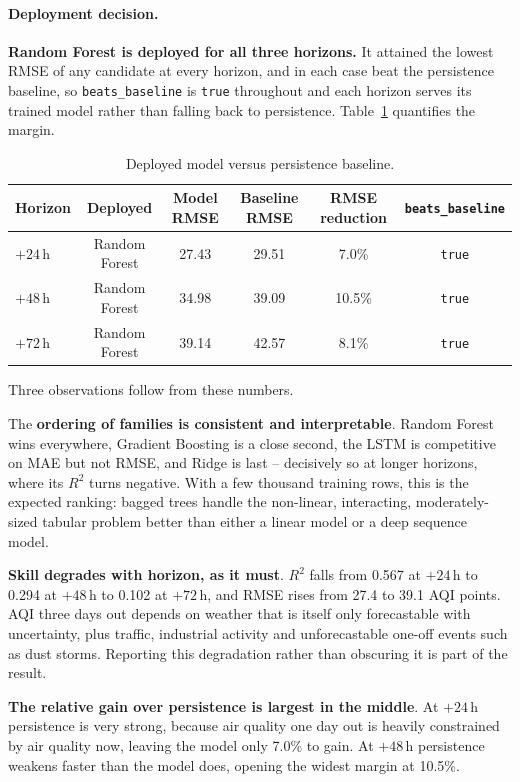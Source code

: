 \documentclass[11pt,a4paper]{article}
\begin{document}
\paragraph{Deployment decision.}
\textbf{Random Forest is deployed for all three horizons.} It attained the
lowest RMSE of any candidate at every horizon, and in each case beat the
persistence baseline, so \texttt{beats\_baseline} is \texttt{true} throughout
and each horizon serves its trained model rather than falling back to
persistence. Table~\ref{tab:baseline} quantifies the margin.

\begin{table}[H]
\centering
\caption{Deployed model versus persistence baseline.}
\label{tab:baseline}
\small
\begin{tabular}{@{}lccccc@{}}
\toprule
\textbf{Horizon} & \textbf{Deployed} & \textbf{Model RMSE} & \textbf{Baseline RMSE}
& \textbf{RMSE reduction} & \texttt{beats\_baseline}\\
\midrule
$+24$\,h & Random Forest & 27.43 & 29.51 & 7.0\% & \texttt{true}\\
$+48$\,h & Random Forest & 34.98 & 39.09 & 10.5\% & \texttt{true}\\
$+72$\,h & Random Forest & 39.14 & 42.57 & 8.1\% & \texttt{true}\\
\bottomrule
\end{tabular}
\end{table}

Three observations follow from these numbers.

The \textbf{ordering of families is consistent and interpretable}. Random
Forest wins everywhere, Gradient Boosting is a close second, the LSTM is
competitive on MAE but not RMSE, and Ridge is last -- decisively so at longer
horizons, where its $R^2$ turns negative. With a few thousand training rows,
this is the expected ranking: bagged trees handle the non-linear, interacting,
moderately-sized tabular problem better than either a linear model or a deep
sequence model.

\textbf{Skill degrades with horizon, as it must}. $R^2$ falls from 0.567 at
$+24$\,h to 0.294 at $+48$\,h to 0.102 at $+72$\,h, and RMSE rises from 27.4 to
39.1 AQI points. AQI three days out depends on weather that is itself only
forecastable with uncertainty, plus traffic, industrial activity and
unforecastable one-off events such as dust storms. Reporting this degradation
rather than obscuring it is part of the result.

\textbf{The relative gain over persistence is largest in the middle}. At
$+24$\,h persistence is very strong, because air quality one day out is heavily
constrained by air quality now, leaving the model only 7.0\% to gain. At
$+48$\,h persistence weakens faster than the model does, opening the widest
margin at 10.5\%.
\end{document}
